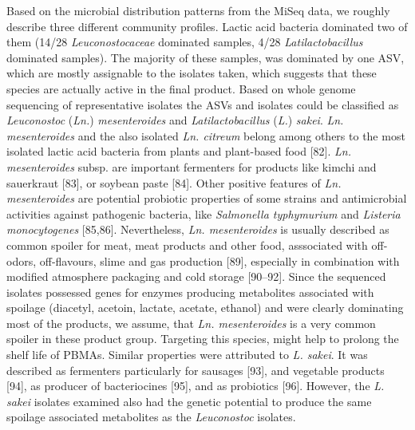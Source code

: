 \documentclass[preprint,3p,
a4paper]{elsarticle} %
\begin{document}
Based on the microbial distribution patterns from the MiSeq data, we
roughly describe three different community profiles. Lactic acid
bacteria dominated two of them (14/28 \emph{Leuconostocaceae} dominated
samples, 4/28 \emph{Latilactobacillus} dominated samples). The majority
of these samples, was dominated by one ASV, which are mostly assignable
to the isolates taken, which suggests that these species are actually
active in the final product. Based on whole genome sequencing of
representative isolates the ASVs and isolates could be classified as
\emph{Leuconostoc} (\emph{Ln.}) \emph{mesenteroides} and
\emph{Latilactobacillus} (\emph{L.}) \emph{sakei}. \emph{Ln.
mesenteroides} and the also isolated \emph{Ln. citreum} belong among
others to the most isolated lactic acid bacteria from plants and
plant-based food {[}82{]}. \emph{Ln. mesenteroides} subsp. are important
fermenters for products like kimchi and sauerkraut {[}83{]}, or soybean
paste {[}84{]}. Other positive features of \emph{Ln. mesenteroides} are
potential probiotic properties of some strains and antimicrobial
activities against pathogenic bacteria, like \emph{Salmonella
typhymurium} and \emph{Listeria monocytogenes} {[}85,86{]}.
Nevertheless, \emph{Ln. mesenteroides} is usually described as common
spoiler for meat, meat products and other food, asssociated with
off-odors, off-flavours, slime and gas production {[}89{]}, especially
in combination with modified atmosphere packaging and cold storage
{[}90--92{]}. Since the sequenced isolates possessed genes for enzymes
producing metabolites associated with spoilage (diacetyl, acetoin,
lactate, acetate, ethanol) and were clearly dominating most of the
products, we assume, that \emph{Ln. mesenteroides} is a very common
spoiler in these product group. Targeting this species, might help to
prolong the shelf life of PBMAs. Similar properties were attributed to
\emph{L. sakei}. It was described as fermenters particularly for
sausages {[}93{]}, and vegetable products {[}94{]}, as producer of
bacteriocines {[}95{]}, and as probiotics {[}96{]}. However, the
\emph{L. sakei} isolates examined also had the genetic potential to
produce the same spoilage associated metabolites as the
\emph{Leuconostoc} isolates.
\end{document}
